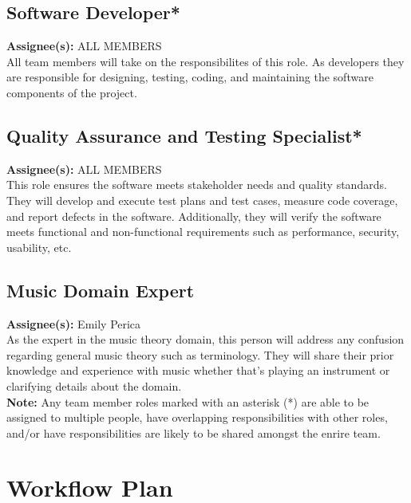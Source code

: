 \documentclass{article}
\begin{document}
\subsection{Software Developer*}
\textbf{Assignee(s):} ALL MEMBERS\\
All team members will take on the responsibilites of this role. As developers they are responsible for designing,
testing, coding, and maintaining the software components of the project.
\subsection{Quality Assurance and Testing Specialist*}
\textbf{Assignee(s):} ALL MEMBERS\\
This role ensures the software meets stakeholder needs and quality standards. They will develop and
execute test plans and test cases, measure code coverage, and report defects in the software. Additionally,
they will verify the software meets functional and non-functional requirements such as performance, security, usability, etc.

\subsection{Music Domain Expert}
\textbf{Assignee(s):} Emily Perica\\
As the expert in the music theory domain, this person will address any confusion regarding general music theory such as terminology. They will
share their prior knowledge and experience with music whether that's playing an instrument or clarifying details about the domain.\\

\textbf{Note:} Any team member roles marked with an asterisk (*) are able to be assigned to multiple people, 
have overlapping responsibilities with other roles, and/or have responsibilities are likely to be shared amongst the enrire team.

\section{Workflow Plan}
\end{document}
